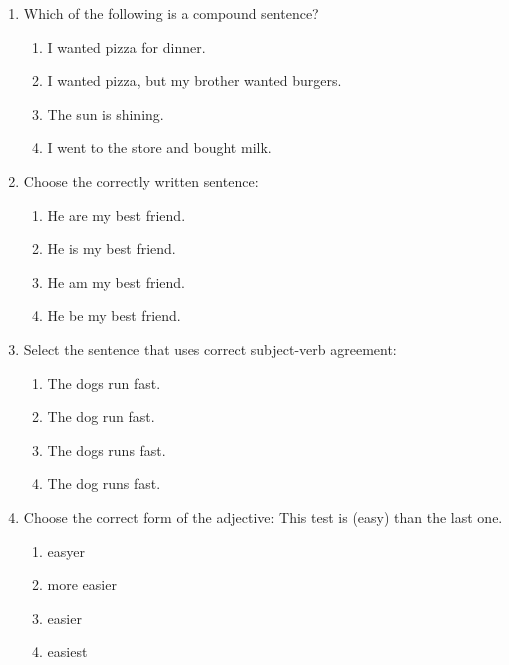 \documentclass[12pt]{article}
\begin{document}
\begin{enumerate}
    \item Which of the following is a compound sentence?
    \begin{enumerate}[label=\Alph*.]
        \item I wanted pizza for dinner.
        \item I wanted pizza, but my brother wanted burgers.
        \item The sun is shining.
        \item I went to the store and bought milk.
    \end{enumerate}
    \vspace{0.5cm}

    \item Choose the correctly written sentence:
    \begin{enumerate}[label=\Alph*.]
        \item He are my best friend.
        \item He is my best friend.
        \item He am my best friend.
        \item He be my best friend.
    \end{enumerate}
    \vspace{0.5cm}

    \item Select the sentence that uses correct subject-verb agreement:
    \begin{enumerate}[label=\Alph*.]
        \item The dogs run fast.
        \item The dog run fast.
        \item The dogs runs fast.
        \item The dog runs fast.
    \end{enumerate}
    \vspace{0.5cm}

    \item Choose the correct form of the adjective: This test is \underline{\hspace{2cm}} (easy) than the last one.
    \begin{enumerate}[label=\Alph*.]
        \item easyer
        \item more easier
        \item easier
        \item easiest
    \end{enumerate}
    \vspace{0.5cm}


\end{enumerate}
\end{document}
